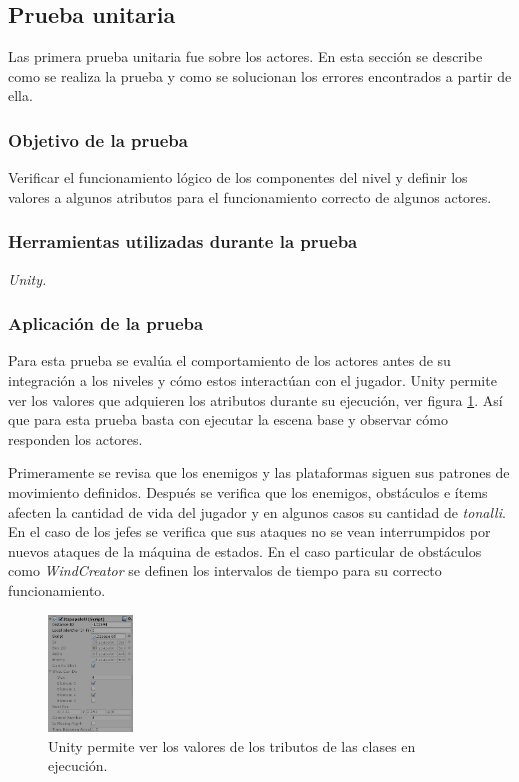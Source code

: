 \subsection{Prueba unitaria}
Las primera prueba unitaria fue sobre los actores. En esta sección se describe
como se realiza la prueba y como se solucionan los errores encontrados a partir
de ella.
\subsubsection{Objetivo de la prueba}
Verificar el funcionamiento lógico de los componentes del nivel y definir los
valores a algunos atributos para el funcionamiento correcto de algunos actores.
\subsubsection{Herramientas utilizadas durante la prueba}
\textit{Unity.}
\subsubsection{Aplicación de la prueba}
Para esta prueba se evalúa el comportamiento de los actores antes de su
integración a los niveles y cómo estos interactúan con el jugador. Unity permite
ver los valores que adquieren los atributos durante su ejecución, ver figura
\ref{fig:Debug01}. Así que para esta prueba basta con ejecutar la escena
base y observar cómo responden los actores.
\\
\par
Primeramente se revisa que los enemigos y las plataformas siguen sus patrones de
movimiento definidos. Después se verifica que los enemigos, obstáculos e ítems
afecten la cantidad de vida del jugador y en algunos casos su cantidad de
\textit{tonalli}. En el caso de los jefes se verifica que sus ataques no se vean
interrumpidos por nuevos ataques de la máquina de estados. En el caso particular
de obstáculos como \textit{WindCreator} se definen los intervalos de tiempo
para su correcto funcionamiento.

        \begin{figure}[h]
                \centering
                \includegraphics[width=0.2\textwidth]{04ResultadosObetnidos/imagenes/enemyPruebas01.png}
                \caption{Unity permite ver los valores de los tributos de las clases en ejecución.}
                \label{fig:Debug01}
        \end{figure}
        
